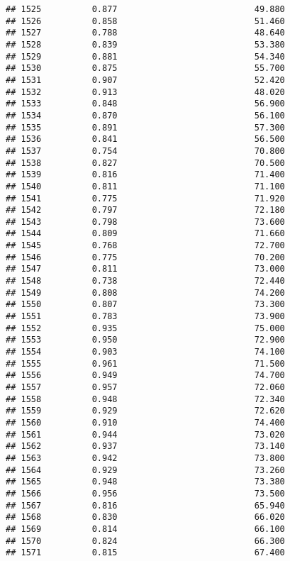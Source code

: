 \documentclass[
]{article}
\begin{document}
\begin{verbatim}
## 1525          0.877                           49.880
## 1526          0.858                           51.460
## 1527          0.788                           48.640
## 1528          0.839                           53.380
## 1529          0.881                           54.340
## 1530          0.875                           55.700
## 1531          0.907                           52.420
## 1532          0.913                           48.020
## 1533          0.848                           56.900
## 1534          0.870                           56.100
## 1535          0.891                           57.300
## 1536          0.841                           56.500
## 1537          0.754                           70.800
## 1538          0.827                           70.500
## 1539          0.816                           71.400
## 1540          0.811                           71.100
## 1541          0.775                           71.920
## 1542          0.797                           72.180
## 1543          0.798                           73.600
## 1544          0.809                           71.660
## 1545          0.768                           72.700
## 1546          0.775                           70.200
## 1547          0.811                           73.000
## 1548          0.738                           72.440
## 1549          0.808                           74.200
## 1550          0.807                           73.300
## 1551          0.783                           73.900
## 1552          0.935                           75.000
## 1553          0.950                           72.900
## 1554          0.903                           74.100
## 1555          0.961                           71.500
## 1556          0.949                           74.700
## 1557          0.957                           72.060
## 1558          0.948                           72.340
## 1559          0.929                           72.620
## 1560          0.910                           74.400
## 1561          0.944                           73.020
## 1562          0.937                           73.140
## 1563          0.942                           73.800
## 1564          0.929                           73.260
## 1565          0.948                           73.380
## 1566          0.956                           73.500
## 1567          0.816                           65.940
## 1568          0.830                           66.020
## 1569          0.814                           66.100
## 1570          0.824                           66.300
## 1571          0.815                           67.400

\end{verbatim}
\end{document}
